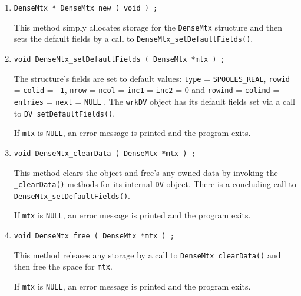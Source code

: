 \begin{enumerate}
\item
\begin{verbatim}
DenseMtx * DenseMtx_new ( void ) ;
\end{verbatim}
This method simply allocates storage for the {\tt DenseMtx} structure 
and then sets the default fields by a call to 
{\tt DenseMtx\_setDefaultFields()}.
\item
\begin{verbatim}
void DenseMtx_setDefaultFields ( DenseMtx *mtx ) ;
\end{verbatim}
The structure's fields are set to default values:
{\tt type} = {\tt SPOOLES\_REAL}, 
{\tt rowid} = {\tt colid} = {\tt -1}, 
{\tt nrow} = {\tt ncol} = {\tt inc1} = {\tt inc2} = 0
and {\tt rowind} = {\tt colind} = {\tt entries} = {\tt next} 
= {\tt NULL} .
The {\tt wrkDV} object has its default fields set via a call to
{\tt DV\_setDefaultFields()}.
\par {}
If {\tt mtx} is {\tt NULL},
an error message is printed and the program exits.
\item
\begin{verbatim}
void DenseMtx_clearData ( DenseMtx *mtx ) ;
\end{verbatim}
This method clears the object and free's any owned data
by invoking the {\tt \_clearData()} methods for its internal
{\tt DV} object.
There is a concluding call to {\tt DenseMtx\_setDefaultFields()}.
\par {}
If {\tt mtx} is {\tt NULL},
an error message is printed and the program exits.
\item
\begin{verbatim}
void DenseMtx_free ( DenseMtx *mtx ) ;
\end{verbatim}
This method releases any storage by a call to 
{\tt DenseMtx\_clearData()} and then free the space for {\tt mtx}.
\par {}
If {\tt mtx} is {\tt NULL},
an error message is printed and the program exits.
\end{enumerate}
\par
